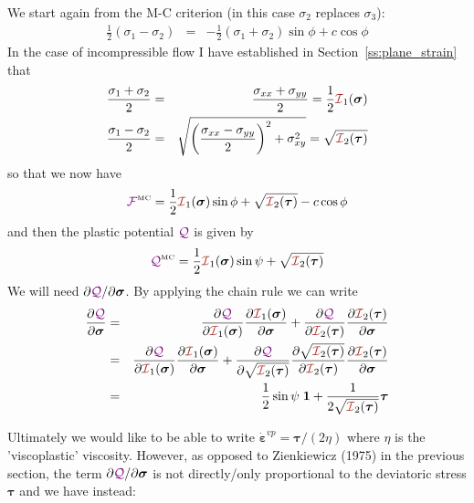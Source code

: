 We start again from the M-C criterion (in this case $\sigma_2$ replaces $\sigma_3$):
\begin{eqnarray}
\frac{1}{2}(\sigma_1-\sigma_2) &=& - \frac{1}{2}(\sigma_1+\sigma_2)  \sin \phi + c \cos \phi  
\end{eqnarray}
In the case of incompressible flow I have established in Section~\ref{ss:plane_strain} that 
\begin{eqnarray}
\frac{\sigma_1+\sigma_2}{2} &=& \frac{\sigma_{xx}+\sigma_{yy}}{2} = \frac12 {\III}_1(\bm\sigma)\\
\frac{\sigma_1-\sigma_2}{2} &=& \sqrt{ \left(\frac{\sigma_{xx}-\sigma_{yy}}{2}\right)^2 + \sigma_{xy}^2  }
=\sqrt{ {\III}_2(\bm\tau)  }
\end{eqnarray}
so that we now have
\[
{\cal \FFF}^{\text{\tiny MC}} 
= \frac{1}{2}{\III}_1(\bm\sigma) \sin\phi  + 
\sqrt{ {\III}_2(\bm\tau)  }
-c \cos \phi 
\]
and then the plastic potential ${\color{violet}\cal Q}$ is given by
\[
{\QQQ}^{\text{\tiny MC}}=\frac{1}{2}{\III}_1(\bm\sigma) \sin\psi  + \sqrt{ {\III}_2(\bm\tau)  }
\]
We will need $\partial {{\color{violet}\cal Q}}/\partial \bm\sigma$.
By applying the chain rule we can write
\begin{eqnarray}
\frac{\partial {\QQQ}}{\partial \bm\sigma} 
&=&
\frac{\partial {\QQQ}}{\partial {\III}_1(\bm\sigma)} 
\frac{\partial {\III}_1(\bm\sigma)}{\partial \bm\sigma} 
+
\frac{\partial {\QQQ}}{\partial {\III}_2(\bm\tau)} 
\frac{\partial {\III}_2(\bm\tau)}{\partial \bm\sigma} \nn\\
&=&
\frac{\partial {\QQQ}}{\partial {\III}_1(\bm\sigma)} 
\frac{\partial {\III}_1(\bm\sigma)}{\partial \bm\sigma} 
+
\frac{\partial {\QQQ}}{\partial \sqrt{{\III}_2(\bm\tau)}} 
\frac{\partial \sqrt{ {\III}_2(\bm\tau)}   }{\partial {\III}_2(\bm\tau)} 
\frac{\partial {\III}_2(\bm\tau)}{\partial \bm\sigma} \nn\\
&=&
\frac12 \sin\psi \; {\bm 1} + \frac{1}{2 \sqrt{ {\III}_2(\bm\tau)}} 
\bm\tau
\end{eqnarray}

Ultimately we would like to be able to write $\dot{\bm \varepsilon}^{vp} = \bm\tau /(2\eta)$
where $\eta$ is the 'viscoplastic' viscosity. However, as opposed to Zienkiewicz (1975) in the 
previous section, the term $\partial {{\color{violet}\cal Q}}/\partial \bm\sigma$
is not directly/only proportional to the deviatoric stress $\bm\tau$ and we have instead:

